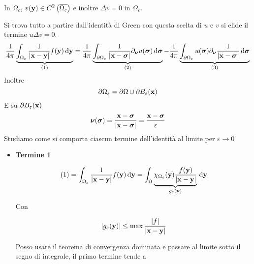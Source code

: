 \begin{dimostrazione}
\begin{figure}[H]
\begin{tikzpicture}[x=0.75pt,y=0.75pt,yscale=-1,xscale=1]
        \end{tikzpicture}
    \end{figure}
    \FloatBarrier

    In $\displaystyle \Omega _{\varepsilon }$, $\displaystyle v(\y) \in C^{2}\left(\overline{\Omega _{\varepsilon }}\right)$ e inoltre $\displaystyle \Delta v=0$ in $\displaystyle \Omega _{\varepsilon }$.

    Si trova tutto a partire dall'identità di Green con questa scelta di $u$ e $v$ si elide il termine $\displaystyle u\Delta v=0$.
    \begin{equation*}
        \frac{1}{4\pi }\underbrace{\int _{\Omega _{\varepsilon }}\frac{1}{| \x -\y| } f(\y) \dyy}_{(1)} =\frac{1}{4\pi }\underbrace{\int _{\partial \Omega _{\varepsilon }}\frac{1}{| \x -\sigg| } \partial _{\nuu} u(\sigg) \dsig}_{(2)} -\frac{1}{4\pi }\underbrace{\int _{\partial \Omega _{\varepsilon }} u(\sigg) \partial _{\nuu}\frac{1}{| \x -\sigg| } \dsig}_{(3)}
    \end{equation*}
    Inoltre
    \begin{equation*}
        \partial \Omega _{\varepsilon } =\partial \Omega \cup \partial B_{\varepsilon }(\x)
    \end{equation*}
    E su $\displaystyle \partial B_{\varepsilon }(\x)$
    \begin{equation*}
        \nuu(\sigg) =\frac{\x -\sigg}{| \x -\sigg| } =\frac{\x -\sigg}{\varepsilon }
    \end{equation*}
    Studiamo come si comporta ciascun termine dell'identità al limite per $\displaystyle \varepsilon \rightarrow 0$
    \begin{itemize}
        \item \textbf{Termine 1}

              \begin{equation*}
                  (1) =\int _{\Omega _{\varepsilon }}\frac{1}{| \x -\y| } f(\y) \dyy =\int _{\Omega }\underbrace{\chi _{\Omega _{\varepsilon }}(\y)\frac{f(\y)}{| \x -\y| }}_{g_{\varepsilon }(\y)} \dyy
              \end{equation*}

              Con

              \begin{equation*}
                  | g_{\varepsilon }(\y)| \leqslant \max\frac{| f| }{| \x -\y| }
              \end{equation*}

              Posso usare il teorema di convergenza dominata e passare al limite sotto il segno di integrale, il primo termine tende a


\end{itemize}
\end{dimostrazione}
